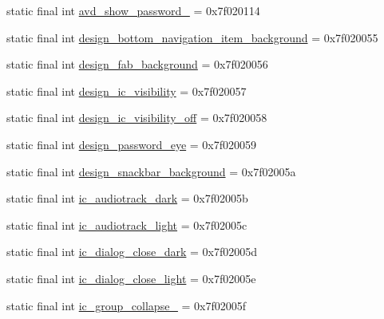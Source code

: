 \begin{CompactItemize}
static final int \hyperlink{classandroid_1_1support_1_1v7_1_1mediarouter_1_1_r_1_1drawable_58c449dad1692ec128e4c8aa11cba41c}{avd\_\-show\_\-password\_} = 0x7f020114
\item 
static final int \hyperlink{classandroid_1_1support_1_1v7_1_1mediarouter_1_1_r_1_1drawable_3aec7b8933d64dfbec3f4aa928df0d86}{design\_\-bottom\_\-navigation\_\-item\_\-background} = 0x7f020055
\item 
static final int \hyperlink{classandroid_1_1support_1_1v7_1_1mediarouter_1_1_r_1_1drawable_aa40e0b82a6ccf2c7c3d50f0c98eeb89}{design\_\-fab\_\-background} = 0x7f020056
\item 
static final int \hyperlink{classandroid_1_1support_1_1v7_1_1mediarouter_1_1_r_1_1drawable_7bca49fdb27c1a569fd67ad6a4123662}{design\_\-ic\_\-visibility} = 0x7f020057
\item 
static final int \hyperlink{classandroid_1_1support_1_1v7_1_1mediarouter_1_1_r_1_1drawable_a161733215b1f0ab8e23b8ae02392a98}{design\_\-ic\_\-visibility\_\-off} = 0x7f020058
\item 
static final int \hyperlink{classandroid_1_1support_1_1v7_1_1mediarouter_1_1_r_1_1drawable_c0ada6e66ae5a4c24eba6d53ee482356}{design\_\-password\_\-eye} = 0x7f020059
\item 
static final int \hyperlink{classandroid_1_1support_1_1v7_1_1mediarouter_1_1_r_1_1drawable_d2574d40df1a07abf4c042765bffdbcc}{design\_\-snackbar\_\-background} = 0x7f02005a
\item 
static final int \hyperlink{classandroid_1_1support_1_1v7_1_1mediarouter_1_1_r_1_1drawable_5a63d5ec9dda123180701a8a7d1ba305}{ic\_\-audiotrack\_\-dark} = 0x7f02005b
\item 
static final int \hyperlink{classandroid_1_1support_1_1v7_1_1mediarouter_1_1_r_1_1drawable_417fc4f29b5961a8cfa0078186dfec45}{ic\_\-audiotrack\_\-light} = 0x7f02005c
\item 
static final int \hyperlink{classandroid_1_1support_1_1v7_1_1mediarouter_1_1_r_1_1drawable_51f2df9f093ff00d63a51d73f4e3e1bb}{ic\_\-dialog\_\-close\_\-dark} = 0x7f02005d
\item 
static final int \hyperlink{classandroid_1_1support_1_1v7_1_1mediarouter_1_1_r_1_1drawable_c5e3654f108f2c56d4868d222238f675}{ic\_\-dialog\_\-close\_\-light} = 0x7f02005e
\item 
static final int \hyperlink{classandroid_1_1support_1_1v7_1_1mediarouter_1_1_r_1_1drawable_dca65d26d1efecee911b686a878632d4}{ic\_\-group\_\-collapse\_} = 0x7f02005f
\item 

\end{CompactItemize}
